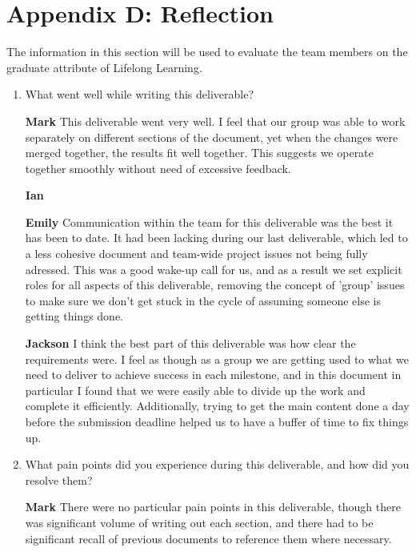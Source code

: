 \documentclass[12pt, titlepage]{article}
\begin{document}
\section*{Appendix D: Reflection}

The information in this section will be used to evaluate the team members on the
graduate attribute of Lifelong Learning.



\begin{enumerate}[leftmargin=*]
  \item What went well while writing this deliverable?
  
  \textbf{Mark} This deliverable went very well. I feel that our group was able to work separately on 
  different sections of the document, yet when the changes were merged together, the results fit well 
  together. This suggests we operate together smoothly without need of excessive feedback.

  \textbf{Ian}

  \textbf{Emily} Communication within the team for this deliverable was the best it has been to date. 
  It had been lacking during our last deliverable, which led to a less cohesive document and team-wide
  project issues not being fully adressed. This was a good wake-up call for us, and as a result we set
  explicit roles for all aspects of this deliverable, removing the concept of 'group' issues to make 
  sure we don't get stuck in the cycle of assuming someone else is getting things done.

  \textbf{Jackson} I think the best part of this deliverable was how clear the requirements were. I feel as 
  though as a group we are getting used to what we need to deliver to achieve success in each milestone, and in 
  this document in particular I found that we were easily able to divide up the work and complete it efficiently. 
  Additionally, trying to get the main content done a day before the submission deadline helped us to have a buffer 
  of time to fix things up.
  
  \item What pain points did you experience during this deliverable, and how
    did you resolve them?

  \textbf{Mark} There were no particular pain points in this deliverable, though there was significant 
  volume of writing out each section, and there had to be significant recall of previous documents to 
  reference them where necessary.


\end{enumerate}
\end{document}
